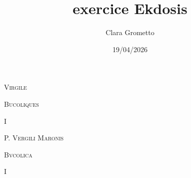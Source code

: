 \documentclass[a4paper,12pt,twoside, titlepage]{book}
\title{exercice Ekdosis}
\author{Clara Grometto}
\date{19/04/2026}
\begin{document}
\maketitle



\begin{alignment}

\begin{translation}

\begin{center}\huge\textsc{Virgile}\end{center}

\begin{center}\large\textsc{Bucoliques}\end{center}

\begin{center}\large I\end{center}

\end{translation}
\begin{edition}

\begin{center}\huge\textsc{P. Vergili Maronis}\end{center}

\begin{center}\large\textsc{Bvcolica}\end{center}

\begin{center}\large I\end{center}
\end{edition}

\end{alignment}
\end{document}
